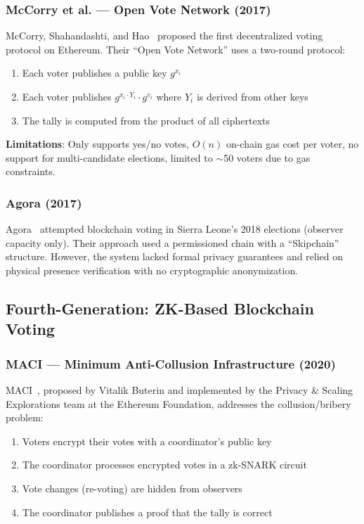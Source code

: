 \subsubsection{McCorry et al. --- Open Vote Network (2017)}

McCorry, Shahandashti, and Hao~\cite{mccorry2017smart} proposed the first decentralized voting protocol on Ethereum. Their ``Open Vote Network'' uses a two-round protocol:
\begin{enumerate}
    \item Each voter publishes a public key $g^{x_i}$
    \item Each voter publishes $g^{x_i \cdot Y_i} \cdot g^{v_i}$ where $Y_i$ is derived from other keys
    \item The tally is computed from the product of all ciphertexts
\end{enumerate}

\textbf{Limitations}: Only supports yes/no votes, $O(n)$ on-chain gas cost per voter, no support for multi-candidate elections, limited to $\sim$50 voters due to gas constraints.

\subsubsection{Agora (2017)}

Agora~\cite{agora2017} attempted blockchain voting in Sierra Leone's 2018 elections (observer capacity only). Their approach used a permissioned chain with a ``Skipchain'' structure. However, the system lacked formal privacy guarantees and relied on physical presence verification with no cryptographic anonymization.

\subsection{Fourth-Generation: ZK-Based Blockchain Voting}

\subsubsection{MACI --- Minimum Anti-Collusion Infrastructure (2020)}

MACI~\cite{buterin2020maci}, proposed by Vitalik Buterin and implemented by the Privacy \& Scaling Explorations team at the Ethereum Foundation, addresses the collusion/bribery problem:

\begin{enumerate}
    \item Voters encrypt their votes with a coordinator's public key
    \item The coordinator processes encrypted votes in a zk-SNARK circuit
    \item Vote changes (re-voting) are hidden from observers
    \item The coordinator publishes a proof that the tally is correct
\end{enumerate}


